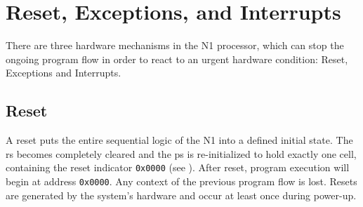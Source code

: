 
\section{Reset, Exceptions, and Interrupts}
\label{reset}

There are three hardware mechanisms in the N1 processor, which can stop the ongoing
program flow in order to react to an urgent hardware condition:
Reset, Exceptions and Interrupts.

\subsection{Reset}
\label{reset:rst}
A reset puts the entire sequential logic of the N1 into a defined initial state.
The \gls{rs} becomes completely cleared and the \gls{ps} is re-initialized
to hold exactly one cell, containing the reset indicator \texttt{0x0000} (see ).
After reset, program execution will begin at address \texttt{0x0000}.
Any context of the previous program flow is lost.
Resets are generated by the system's hardware and occur at least once during power-up.

